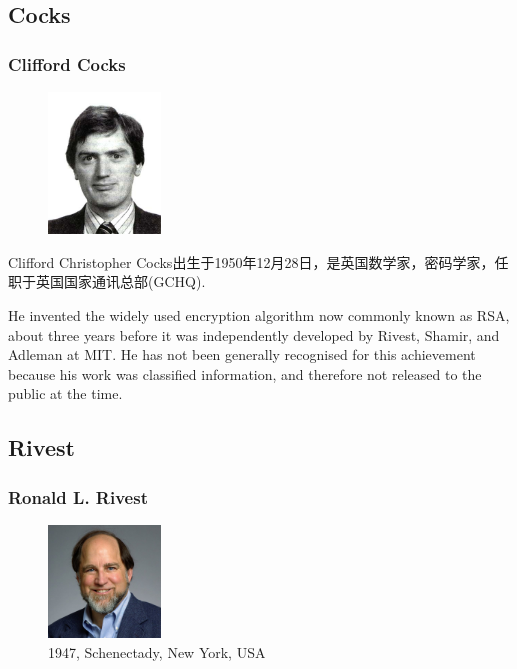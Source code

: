 \documentclass[slidestop,compress,mathserif]{beamer}
\begin{document}
\subsection{\hfill Cocks}
\begin{frame}
  \frametitle{Clifford Cocks}
  
  \begin{multicols}{2}
    \begin{figure}
      \includegraphics[width=3cm]{Cocks.jpg}
    \end{figure}
    Clifford Christopher Cocks出生于1950年12月28日，是英国数学家，密码学家，任职于英国国家通讯总部(GCHQ).
    
    He invented the widely used encryption algorithm now commonly known as RSA, about three years before it was independently developed by Rivest, Shamir, and Adleman at MIT. He has not been generally recognised for this achievement because his work was classified information, and therefore not released to the public at the time.

    
  \end{multicols}
  
\end{frame}

\subsection{\hfill Rivest}
\begin{frame}
  \frametitle{Ronald L. Rivest}
  \begin{multicols}{2}
    \begin{figure}
      \includegraphics[width=3cm]{rivest_photo.jpg}
      \caption{1947, Schenectady, New York, USA}
    \end{figure}
    
  \end{multicols}
  
\end{frame}
\end{document}

